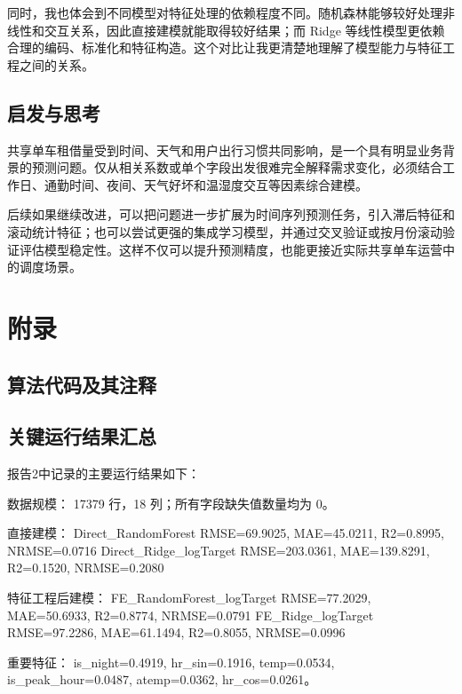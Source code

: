 \documentclass[UTF8,a4paper,12pt]{ctexart}
\begin{document}
同时，我也体会到不同模型对特征处理的依赖程度不同。随机森林能够较好处理非线性和交互关系，因此直接建模就能取得较好结果；而 Ridge 等线性模型更依赖合理的编码、标准化和特征构造。这个对比让我更清楚地理解了模型能力与特征工程之间的关系。

\subsection{启发与思考}

共享单车租借量受到时间、天气和用户出行习惯共同影响，是一个具有明显业务背景的预测问题。仅从相关系数或单个字段出发很难完全解释需求变化，必须结合工作日、通勤时间、夜间、天气好坏和温湿度交互等因素综合建模。

后续如果继续改进，可以把问题进一步扩展为时间序列预测任务，引入滞后特征和滚动统计特征；也可以尝试更强的集成学习模型，并通过交叉验证或按月份滚动验证评估模型稳定性。这样不仅可以提升预测精度，也能更接近实际共享单车运营中的调度场景。

\section{附录}

\subsection*{算法代码及其注释}


\subsection*{关键运行结果汇总}

报告2中记录的主要运行结果如下：

\begin{CodeBlock}
数据规模：
17379 行，18 列；所有字段缺失值数量均为 0。

直接建模：
Direct_RandomForest        RMSE=69.9025,  MAE=45.0211,  R2=0.8995, NRMSE=0.0716
Direct_Ridge_logTarget     RMSE=203.0361, MAE=139.8291, R2=0.1520, NRMSE=0.2080

特征工程后建模：
FE_RandomForest_logTarget  RMSE=77.2029, MAE=50.6933, R2=0.8774, NRMSE=0.0791
FE_Ridge_logTarget         RMSE=97.2286, MAE=61.1494, R2=0.8055, NRMSE=0.0996

重要特征：
is_night=0.4919, hr_sin=0.1916, temp=0.0534,
is_peak_hour=0.0487, atemp=0.0362, hr_cos=0.0261。
\end{CodeBlock}
\end{document}
